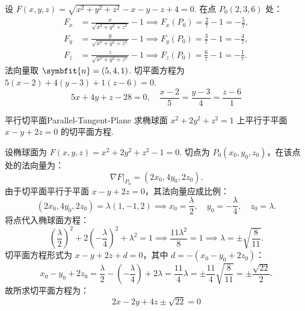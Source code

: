 \begin{solution}

    设 $F(x, y, z) = \sqrt{x^2 + y^2 + z^2} - x - y - z + 4 = 0$. 在点 $P_0(2, 3, 6)$ 处：
    \begin{equation}
        \begin{aligned}
            F_x & = \frac{x}{\sqrt{x^2 + y^2 + z^2}} - 1 \implies F_x(P_0) = \frac{2}{7} - 1 = -\frac{5}{7}, \\
            F_y & = \frac{y}{\sqrt{x^2 + y^2 + z^2}} - 1 \implies F_y(P_0) = \frac{3}{7} - 1 = -\frac{4}{7}, \\
            F_z & = \frac{z}{\sqrt{x^2 + y^2 + z^2}} - 1 \implies F_z(P_0) = \frac{6}{7} - 1 = -\frac{1}{7}.
        \end{aligned}
    \end{equation}
    法向量取 $\symbfit{n} = (5, 4, 1)$. 切平面方程为 $5(x - 2) + 4(y - 3) + 1(z - 6) = 0$.
    \begin{equation}
        \boxed{5x + 4y + z - 28 = 0, \quad \frac{x - 2}{5} = \frac{y - 3}{4} = \frac{z - 6}{1}}
    \end{equation}
\end{solution}

\begin{problem}{平行切平面}{Parallel-Tangent-Plane}
    求椭球面 $x^2 + 2y^2 + z^2 = 1$ 上平行于平面 $x - y + 2z = 0$ 的切平面方程.
\end{problem}

\begin{solution}
    设椭球面为 $F(x, y, z) = x^2 + 2y^2 + z^2 - 1 = 0$. 切点为 $P_0(x_0, y_0, z_0)$，在该点处的法向量为：
    \begin{equation}
        \nabla F|_{P_0} = (2x_0, 4y_0, 2z_0).
    \end{equation}
    由于切平面平行于平面 $x - y + 2z = 0$，其法向量应成比例：
    \begin{equation}
        (2x_0, 4y_0, 2z_0) = \lambda(1, -1, 2) \implies x_0 = \frac{\lambda}{2}, \quad y_0 = -\frac{\lambda}{4}, \quad z_0 = \lambda.
    \end{equation}
    将点代入椭球面方程：
    \begin{equation}
        \left(\frac{\lambda}{2}\right)^2 + 2\left(-\frac{\lambda}{4}\right)^2 + \lambda^2 = 1 \implies \frac{11\lambda^2}{8} = 1 \implies \lambda = \pm \sqrt{\frac{8}{11}}.
    \end{equation}
    切平面方程形式为 $x - y + 2z + d = 0$，其中 $d = -(x_0 - y_0 + 2z_0)$：
    \begin{equation}
        x_0 - y_0 + 2z_0 = \frac{\lambda}{2} - \left(-\frac{\lambda}{4}\right) + 2\lambda = \frac{11}{4}\lambda = \pm \frac{11}{4} \sqrt{\frac{8}{11}} = \pm \frac{\sqrt{22}}{2}.
    \end{equation}
    故所求切平面方程为：
    \begin{equation}
        \boxed{2x - 2y + 4z \pm \sqrt{22} = 0}
    \end{equation}
\end{solution}


